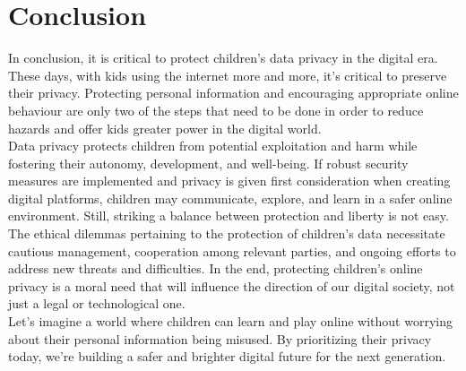 \documentclass[a4paper, 10 pt, conference]{ieeeconf}  %
\begin{document}
\section{Conclusion}
In conclusion, it is critical to protect children’s data privacy in the digital era. These days, with kids using the internet more and more, it's critical to preserve their privacy. Protecting personal information and encouraging appropriate online behaviour are only two of the steps that need to be done in order to reduce hazards and offer kids greater power in the digital world. 
\\ Data privacy protects children from potential exploitation and harm while fostering their autonomy, development, and well-being. If robust security measures are implemented and privacy is given first consideration when creating digital platforms, children may communicate, explore, and learn in a safer online environment. Still, striking a balance between protection and liberty is not easy. The ethical dilemmas pertaining to the protection of children’s data necessitate cautious management, cooperation among relevant parties, and ongoing efforts to address new threats and difficulties. In the end, protecting children’s online privacy is a moral need that will influence the direction of our digital society, not just a legal or technological one. 
\\ Let’s imagine a world where children can learn and play online without worrying about their personal information being misused. By prioritizing their privacy today, we’re building a safer and brighter digital future for the next generation.





\addtolength{\textheight}{-12cm}   %




\end{document}
